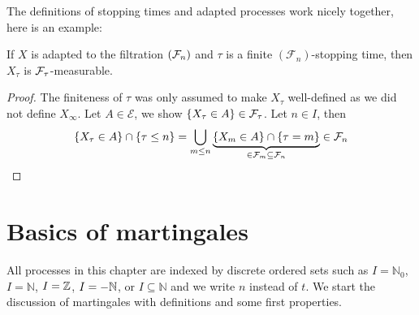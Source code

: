 The definitions of stopping times and adapted processes work nicely together, here is an example:
\begin{llemma}
\begin{prop}\label{cha2_prop_X_tau_adapted}
	If $X$ is adapted to the filtration $(\mathcal{F}_n)$ and $\tau$ is a finite $(\mathcal F_n)$-stopping time, then $X_{\tau}$ is $\mathcal{F}_{\tau}$-measurable.
\end{prop}
\end{llemma}
\begin{proof}[Proof]
	The finiteness of $\tau$ was only assumed to make $X_\tau$ well-defined as we did not define $X_\infty$. Let $A \in \mathcal{E}$, we show $\lbrace X_{\tau} \in A \rbrace \in \mathcal{F}_{\tau}$. Let $n\in I$, then
	\begin{align*}
		\lbrace X_{\tau} \in A \rbrace \cap \lbrace \tau \leq n \rbrace = \bigcup_{m\leq n}\underbrace{ \{ X_m \in A \} \cap \{ \tau = m \} }_{\in \mathcal F_m \subseteq \mathcal F_n}\in \mathcal{F}_n
	\end{align*}
\end{proof}


	\marginpar{\textcolor{red}{Lecture 5}}
\section{Basics of martingales}

All processes in this chapter are indexed by discrete ordered sets such as $I = \mathbb{N}_0$, $I =\mathbb{N}$, $I=\mathbb{Z}$, $I=-\mathbb{N}$, or $I \subseteq \mathbb{N}$ and we write $n$ instead of $t$. We start the discussion of martingales with definitions and some first properties.

